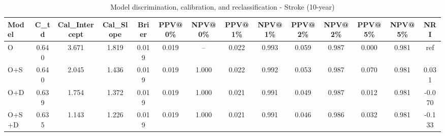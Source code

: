\begin{table}[htbp]
\centering
\small
\caption{Model discrimination, calibration, and reclassification - Stroke (10-year)}
\label{tab:perf_stroke_10y}
\begin{tabular}{lccccccccccccc}
\toprule
Model & C\_td & Cal\_Intercept & Cal\_Slope & Brier & PPV@0\% & NPV@0\% & PPV@1\% & NPV@1\% & PPV@2\% & NPV@2\% & PPV@5\% & NPV@5\% & NRI \\
\midrule
O & 0.640 & 3.671 & 1.819 & 0.019 & 0.019 & -- & 0.022 & 0.993 & 0.059 & 0.987 & 0.000 & 0.981 & ref \\
O+S & 0.640 & 2.045 & 1.436 & 0.019 & 0.019 & 1.000 & 0.022 & 0.992 & 0.053 & 0.987 & 0.070 & 0.981 & 0.031 \\
O+D & 0.639 & 1.754 & 1.372 & 0.019 & 0.019 & 1.000 & 0.021 & 0.991 & 0.049 & 0.987 & 0.012 & 0.981 & -0.070 \\
O+S+D & 0.635 & 1.143 & 1.226 & 0.019 & 0.019 & 1.000 & 0.021 & 0.991 & 0.046 & 0.986 & 0.032 & 0.981 & -0.133 \\
\bottomrule
\end{tabular}
\end{table}